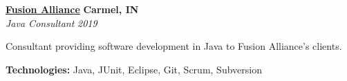 %
    \headerrow
        {\textbf{\href{https://fusionalliance.com/}{Fusion Alliance}}}
        {\textbf{Carmel, IN}}
    \\
    \headerrow
        {\emph{Java Consultant}}
        {\emph{2019}}
    \begin{itemize*}
        \item Consultant providing software development in Java to Fusion Alliance's clients.
    \end{itemize*}

    \hspace{1.0em}
        {\textbf{Technologies:} Java, JUnit, Eclipse, Git, Scrum, Subversion}
